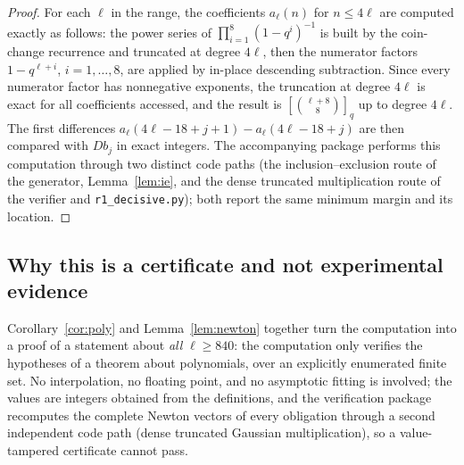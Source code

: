 \documentclass[11pt]{article}
\theoremstyle{definition}
\begin{document}
\begin{proof}
For each $\ell$ in the range, the coefficients $a_\ell(n)$ for $n\le4\ell$ are computed exactly as
follows: the power series of $\prod_{i=1}^{8}(1-q^{i})^{-1}$ is built by the coin-change recurrence
and truncated at degree $4\ell$, then the numerator factors $1-q^{\ell+i}$, $i=1,\dots,8$, are
applied by in-place descending subtraction. Since every numerator factor has nonnegative exponents,
the truncation at degree $4\ell$ is exact for all coefficients accessed, and the result is
$[\ell+8\choose 8]_q$ up to degree $4\ell$. The first differences
$a_\ell(4\ell-18+j+1)-a_\ell(4\ell-18+j)$ are then compared with $Db_j$ in exact integers.
The accompanying package performs this computation through two distinct code paths (the
inclusion--exclusion route of the generator, Lemma~\ref{lem:ie}, and the dense truncated
multiplication route of the verifier and \texttt{r1\_decisive.py}); both report the same minimum
margin and its location.
\end{proof}

\subsection{Why this is a certificate and not experimental evidence}\label{sec:why}
Corollary~\ref{cor:poly} and Lemma~\ref{lem:newton} together turn the computation into a proof of a
statement about \emph{all} $\ell\ge840$: the computation only verifies the hypotheses of a theorem
about polynomials, over an explicitly enumerated finite set. No interpolation, no floating point, and
no asymptotic fitting is involved; the values are integers obtained from the definitions, and the
verification package recomputes the complete Newton vectors of every obligation through a second
independent code path (dense truncated Gaussian multiplication), so a value-tampered certificate
cannot pass.
\end{document}
